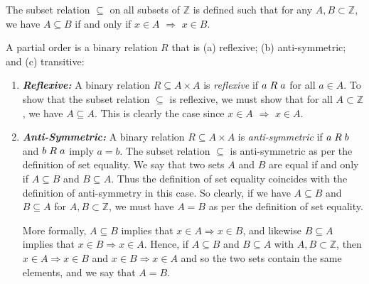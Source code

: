 \documentclass[a4paper,12pt]{article}
\begin{document}

The subset relation $\subseteq$ on all subsets of $\mathbb{Z}$ is defined such that for any $A, B \subset \mathbb{Z}$, we have $A \subseteq B$ if and only if $x \in A$ $\Rightarrow$ $x \in B$. 

A partial order is a binary relation $R$ that is (a) reflexive; (b) anti-symmetric; and (c) transitive:

\begin{enumerate}
\item \textit{\textbf{Reflexive:}} A binary relation $R \subseteq A \times A$ is \textit{reflexive} if $a \hspace{1mm} R \hspace{1mm} a$ for all $a \in A$. To show that the subset relation $\subseteq$ is reflexive, we must show that for all $A \subset \mathbb{Z}$, we have $A \subseteq A$. This is clearly the case since $x \in A$ $\Rightarrow$ $x \in A$.

\item \textit{\textbf{Anti-Symmetric:}} A binary relation $R \subseteq A \times A$ is \textit{anti-symmetric} if $a \hspace{1mm} R \hspace{1mm} b$ and $b \hspace{1mm} R \hspace{1mm} a$ imply $a=b$. The subset relation $\subseteq$ is anti-symmetric as per the definition of set equality. We say that two sets $A$ and $B$ are equal if and only if $A \subseteq B$ and $B \subseteq A$. Thus the definition of set equality coincides with the definition of anti-symmetry in this case. So clearly, if we have $A \subseteq B$ and $B \subseteq A$ for $A, B \subset \mathbb{Z}$, we must have $A = B$ as per the definition of set equality. 

More formally, $A \subseteq B$ implies that $x \in A \Rightarrow x \in B$, and likewise $B \subseteq A$ implies that $x \in B \Rightarrow x \in A$. Hence, if $A \subseteq B$ and $B \subseteq A$ with $A, B \subset \mathbb{Z}$, then $x \in A \Rightarrow x \in B$ and $x \in B \Rightarrow x \in A$ and so the two sets contain the same elements, and we say that $A = B$. 


\end{enumerate}
\end{document}
